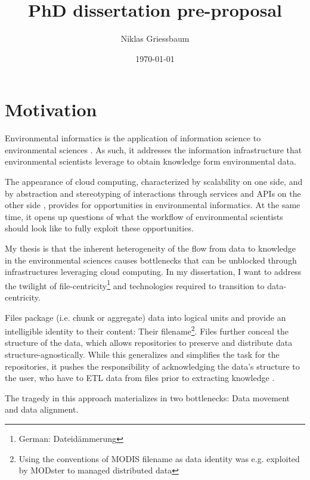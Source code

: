 \documentclass[a4paper,10pt]{article}
\title{PhD dissertation pre-proposal}
\author{Niklas Griessbaum}
\date{\today}
\begin{document}
\maketitle

\tableofcontents

\newpage
\printglossaries


\newpage

\section{Motivation}

Environmental informatics is the application of information science to environmental sciences \citep{Frew2012}.
As such, it addresses the information infrastructure that environmental scientists leverage
to obtain knowledge form environmental data.

The appearance of cloud computing, characterized by scalability on one side, 
and by abstraction and stereotyping of interactions through services and \glspl{API} on the other side \citep{Foster2017}, 
provides for opportunities in environmental informatics. 
At the same time, it opens up questions of what the workflow
of environmental scientists should look like to fully exploit these opportunities.

My thesis is that the inherent heterogeneity of the flow from data to knowledge
in the environmental sciences causes bottlenecks that can be unblocked through 
infrastructures leveraging cloud computing. 
In my dissertation, I want to address the twilight of file-centricity\footnote{German: Dateidämmerung } and technologies required to transition to data-centricity.

Files package (i.e. chunk or aggregate) data into logical units and provide an intelligible identity to their content: Their filename\footnote{Using the conventions of \gls{MODIS} filename as data identity was e.g. exploited by MODster \citep{Frew2005, Frew2002} to managed distributed data}.
Files further conceal the structure of the data, which allows repositories to preserve and distribute data structure-agnostically. 
While this generalizes and simplifies the task for the repositories, it pushes the responsibility of acknowledging the data's structure to the user,
who have to \gls{ETL} data from files prior to extracting knowledge \citep{Rilee2016, Szalay2009}.

The tragedy in this approach materializes in two bottlenecks: Data movement and data alignment.
\end{document}
